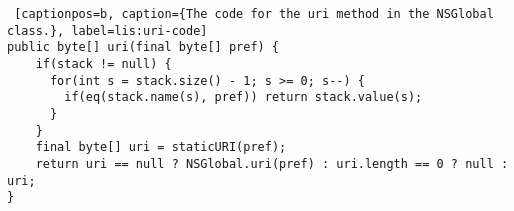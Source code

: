 \begin{lstlisting} [captionpos=b, caption={The code for the uri method in the NSGlobal class.}, label=lis:uri-code] 
public byte[] uri(final byte[] pref) {
    if(stack != null) {
      for(int s = stack.size() - 1; s >= 0; s--) {
        if(eq(stack.name(s), pref)) return stack.value(s);
      }
    }
    final byte[] uri = staticURI(pref);
    return uri == null ? NSGlobal.uri(pref) : uri.length == 0 ? null : uri;
}
\end{lstlisting}
